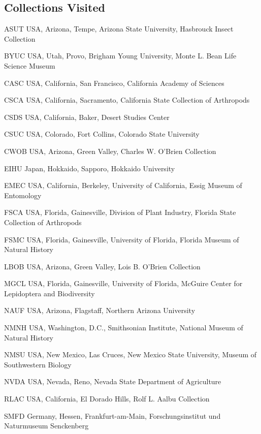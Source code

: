 \documentclass[12pt,a4paper]{article}
\begin{document}
	\subsection*{Collections Visited}
		\begin{collections}
			\item [ASUT] USA, Arizona, Tempe, Arizona State University, Hasbrouck Insect Collection
			\item [BYUC] USA, Utah, Provo, Brigham Young University, Monte L. Bean Life Science Museum
			\item [CASC] USA, California, San Francisco, California Academy of Sciences
			\item [CSCA] USA, California, Sacramento, California State Collection of Arthropods
			\item [CSDS] USA, California, Baker, Desert Studies Center
			\item [CSUC] USA, Colorado, Fort Collins, Colorado State University
			\item [CWOB] USA, Arizona, Green Valley, Charles W. O'Brien Collection
			\item [EIHU] Japan, Hokkaido, Sapporo, Hokkaido University
			\item [EMEC] USA, California, Berkeley, University of California, Essig Museum of Entomology
			\item [FSCA] USA, Florida, Gainesville, Division of Plant Industry, Florida State Collection of Arthropods
			\item [FSMC] USA, Florida, Gainesville, University of Florida, Florida Museum of Natural History
			\item [LBOB] USA, Arizona, Green Valley, Lois B. O'Brien Collection
			\item [MGCL] USA, Florida, Gainesville, University of Florida, McGuire Center for Lepidoptera and Biodiversity
			\item [NAUF] USA, Arizona, Flagstaff, Northern Arizona University
			\item [NMNH] USA, Washington, D.C., Smithsonian Institute, National Museum of Natural History
			\item [NMSU] USA, New Mexico, Las Cruces, New Mexico State University, Museum of Southwestern Biology
			\item [NVDA] USA, Nevada, Reno, Nevada State Department of Agriculture
			\item [RLAC] USA, California, El Dorado Hills, Rolf L. Aalbu Collection
			\item [SMFD] Germany, Hessen, Frankfurt-am-Main, Forschungsinstitut und Naturmuseum Senckenberg

\end{collections}
\end{document}
